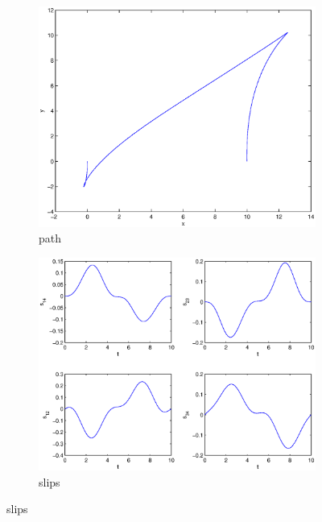 \begin{figure}
\begin{subfigure}[b]{\textwidth}
\centering
\includegraphics[height=0.3\textheight]{img/final_15_15_10_path.eps}
\caption{path}
\end{subfigure}

\begin{subfigure}[b]{\textwidth}
\centering
\includegraphics[height=0.3\textheight]{img/final_15_15_10_slips.eps}
\caption{slips}
\end{subfigure}


\end{figure}
